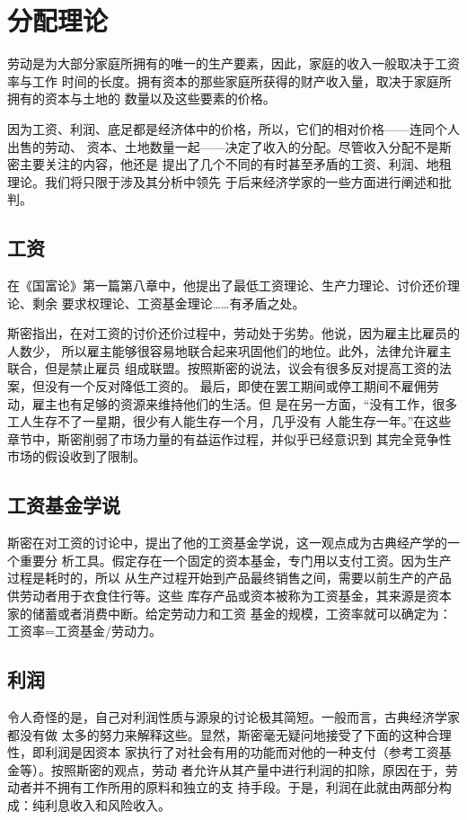 \section{分配理论}

劳动是为大部分家庭所拥有的唯一的生产要素，因此，家庭的收入一般取决于工资率与工作
时间的长度。拥有资本的那些家庭所获得的财产收入量，取决于家庭所拥有的资本与土地的
数量以及这些要素的价格。

因为工资、利润、底足都是经济体中的价格，所以，它们的相对价格——连同个人出售的劳动、
资本、土地数量一起——决定了收入的分配。尽管收入分配不是斯密主要关注的内容，他还是
提出了几个不同的有时甚至矛盾的工资、利润、地租理论。我们将只限于涉及其分析中领先
于后来经济学家的一些方面进行阐述和批判。

\subsection{工资}

在《国富论》第一篇第八章中，他提出了最低工资理论、生产力理论、讨价还价理论、剩余
要求权理论、工资基金理论……有矛盾之处。

斯密指出，在对工资的讨价还价过程中，劳动处于劣势。他说，因为雇主比雇员的人数少，
所以雇主能够很容易地联合起来巩固他们的地位。此外，法律允许雇主联合，但是禁止雇员
组成联盟。按照斯密的说法，议会有很多反对提高工资的法案，但没有一个反对降低工资的。
最后，即使在罢工期间或停工期间不雇佣劳动，雇主也有足够的资源来维持他们的生活。但
是在另一方面，“没有工作，很多工人生存不了一星期，很少有人能生存一个月，几乎没有
人能生存一年。”在这些章节中，斯密削弱了市场力量的有益运作过程，并似乎已经意识到
其完全竞争性市场的假设收到了限制。

\subsection{工资基金学说}

斯密在对工资的讨论中，提出了他的工资基金学说，这一观点成为古典经产学的一个重要分
析工具。假定存在一个固定的资本基金，专门用以支付工资。因为生产过程是耗时的，所以
从生产过程开始到产品最终销售之间，需要以前生产的产品供劳动者用于衣食住行等。这些
库存产品或资本被称为工资基金，其来源是资本家的储蓄或者消费中断。给定劳动力和工资
基金的规模，工资率就可以确定为：工资率=工资基金/劳动力。

\subsection{利润}

令人奇怪的是，自己对利润性质与源泉的讨论极其简短。一般而言，古典经济学家都没有做
太多的努力来解释这些。显然，斯密毫无疑问地接受了下面的这种合理性，即利润是因资本
家执行了对社会有用的功能而对他的一种支付（参考工资基金等）。按照斯密的观点，劳动
者允许从其产量中进行利润的扣除，原因在于，劳动者并不拥有工作所用的原料和独立的支
持手段。于是，利润在此就由两部分构成：纯利息收入和风险收入。

